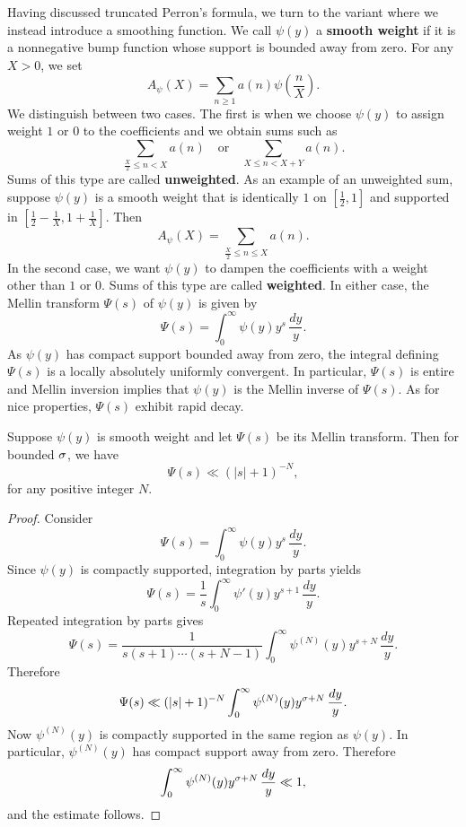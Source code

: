     Having discussed truncated Perron's formula, we turn to the variant where we instead introduce a smoothing function. We call \(\psi(y)\) a \textbf{smooth weight} if it is a nonnegative bump function whose support is bounded away from zero. For any \(X > 0\), we set
    \[
      A_{\psi}(X) = \sum_{n \ge 1}a(n)\psi\left(\frac{n}{X}\right).
    \]
    We distinguish between two cases. The first is when we choose \(\psi(y)\) to assign weight \(1\) or \(0\) to the coefficients and we obtain sums such as
    \[
      \sum_{\frac{X}{2} \le n < X}a(n) \quad \text{or} \quad \sum_{X \le n < X+Y}a(n).
    \]
    Sums of this type are called \textbf{unweighted}. As an example of an unweighted sum, suppose \(\psi(y)\) is a smooth weight that is identically \(1\) on \(\left[\frac{1}{2},1\right]\) and supported in \(\left[\frac{1}{2}-\frac{1}{X},1+\frac{1}{X}\right]\). Then
    \[
      A_{\psi}(X) = \sum_{\frac{X}{2} \le n \le X}a(n).
    \]
    In the second case, we want \(\psi(y)\) to dampen the coefficients with a weight other than \(1\) or \(0\). Sums of this type are called \textbf{weighted}. In either case, the Mellin transform \(\Psi(s)\) of \(\psi(y)\) is given by
    \[
      \Psi(s) = \int_{0}^{\infty}\psi(y)y^{s}\,\frac{dy}{y}.
    \]
    As \(\psi(y)\) has compact support bounded away from zero, the integral defining \(\Psi(s)\) is a locally absolutely uniformly convergent. In particular, \(\Psi(s)\) is entire and Mellin inversion implies that \(\psi(y)\) is the Mellin inverse of \(\Psi(s)\). As for nice properties, \(\Psi(s)\) exhibit rapid decay.

    \begin{proposition}\label{prop:smoothing_function_Mellin_inverse_vertical_strips}
      Suppose \(\psi(y)\) is smooth weight and let \(\Psi(s)\) be its Mellin transform. Then for bounded \(\sigma\), we have
      \[
        \Psi(s) \ll (|s|+1)^{-N},
      \]
      for any positive integer \(N\).
    \end{proposition}
    \begin{proof}
      Consider
      \[
        \Psi(s) = \int_{0}^{\infty}\psi(y)y^{s}\,\frac{dy}{y}.
      \]
      Since \(\psi(y)\) is compactly supported, integration by parts yields
      \[
        \Psi(s) = \frac{1}{s}\int_{0}^{\infty}\psi'(y)y^{s+1}\,\frac{dy}{y}.
      \]
      Repeated integration by parts gives
      \[
        \Psi(s) = \frac{1}{s(s+1) \cdots (s+N-1)}\int_{0}^{\infty}\psi^{(N)}(y)y^{s+N}\,\frac{dy}{y}.
      \]
      Therefore
      \[
        \Psi(s) \ll (|s|+1)^{-N}\int_{0}^{\infty}\psi^{(N)}(y)y^{\sigma+N}\,\frac{dy}{y}.
      \]
      Now \(\psi^{(N)}(y)\) is compactly supported in the same region as \(\psi(y)\). In particular, \(\psi^{(N)}(y)\) has compact support away from zero. Therefore
      \[
        \int_{0}^{\infty}\psi^{(N)}(y)y^{\sigma+N}\,\frac{dy}{y} \ll 1,
      \]
      and the estimate follows.
    \end{proof}
    
